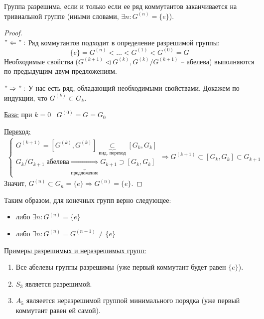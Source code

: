 \begin{theorem}
    Группа разрешима, если и только если ее ряд коммутантов заканчивается на тривиальной группе (иными словами, $\exists n : G^{(n)} = \{e\}$).
\end{theorem}
\begin{proof} \quad \\
     $"\Leftarrow":$ Ряд коммутантов подходит в определение разрешимой группы:
     \[ \{e\} = G^{(n)} < \dots < G^{(1)} < G^{(0)} = G \]
     Необходимые свойства ($G^{(k + 1)} \lhd G^{(k)}, G^{(k)} / G^{(k + 1)}$ -- абелева) выполняются по предыдущим двум предложениям.
    
     $"\Rightarrow":$ У нас есть ряд, обладающий необходимыми свойствами.
     Докажем по индукции, что $G^{(k)} \subset G_k$.

     \quad \underline{База:} при $k = 0 \;\;\; G^{(0)} = G = G_0$

     \quad \underline{Переход:}
     \begin{gather*}
        \begin{cases}
            G^{(k + 1)} = [G^{(k)}, G^{(k)}] \underbrace{\subset}_{\text{инд. переход}} [G_k, G_k] \\
            G_k / G_{k + 1} \; \text{абелева} \underbrace{\Rightarrow}_{\text{предложение}} G_{k + 1} \supset [G_k, G_k]
           \end{cases} \Rightarrow G^{(k + 1)} \subset [G_k, G_k] \subset G_{k + 1}
     \end{gather*}
    Значит, $G^{(n)} \subset G_n = \{e\} \Rightarrow G^{(n)} = \{e\}$.
\end{proof}
Таким образом, для конечных групп верно следующее:
\begin{itemize}
    \item либо $\exists n : G^{(n)} = \{e\}$
    \item либо $\exists n : G^{(n)} = G^{(n - 1)} \neq \{e\}$
\end{itemize}

\underline{Примеры разрешимых и неразрешимых групп:}
\begin{enumerate}
    \item Все абелевы группы разрешимы (уже первый коммутант будет равен $\{e\}$).
    \item $S_3$ является разрешимой.
    \item $A_5$ являеется неразрешимой группой минимального порядка (уже первый коммутант равен ей самой).
\end{enumerate}

